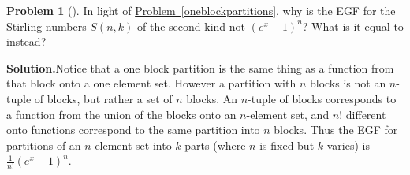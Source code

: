 \documentclass[10pt,]{book}
\theoremstyle{plain}
\theoremstyle{definition}
\newtheorem{activity}[project]{Problem}
\theoremstyle{definition}
\numberwithin{equation}{chapter}
\begin{document}
\begin{activity}[]\label{activity-408}
In light of \hyperref[oneblockpartitions]{Problem~\ref{oneblockpartitions}}, why is the EGF for the Stirling numbers \(S(n,k)\) of the second kind not \((e^x -1)^n\)? What is it equal to instead?%
\par\medskip\noindent%
\textbf{Solution.}\quad Notice that a one block partition is the same thing as a function from that block onto a one element set. However a partition with \(n\) blocks is not an \(n\)-tuple of blocks, but rather a set of \(n\) blocks. An \(n\)-tuple of blocks corresponds to a function from the union of the blocks onto an \(n\)-element set, and \(n!\) different onto functions correspond to the same partition into \(n\) blocks. Thus the EGF for partitions of an \(n\)-element set into \(k\) parts (where \(n\) is fixed but \(k\) varies) is \(\frac{1}{n!} (e^x -1)^n\).%
\end{activity}
\typeout{************************************************}
\typeout{************************************************}
\end{document}

